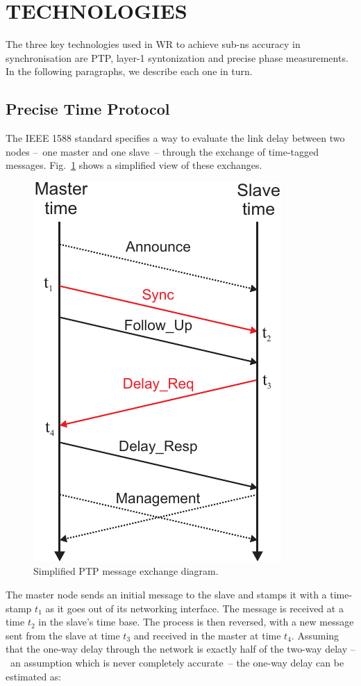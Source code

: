 \documentclass{../JAC2003}
\begin{document}
\section{TECHNOLOGIES}

The three key technologies used in WR to achieve sub-ns accuracy in
synchronisation are PTP, layer-1 syntonization and precise phase
measurements. In the following paragraphs, we describe each one in
turn.

\subsection{Precise Time Protocol}

The IEEE 1588 standard specifies a way to evaluate the link delay
between two nodes --~one master and one slave~-- through the exchange
of time-tagged messages. Fig.~\ref{ptp-fig} shows a simplified view of
these exchanges.

\begin{figure}[htb]
   \centering
   \includegraphics*[width=0.5\columnwidth]{protocol/ptpMSGs-color.pdf}
   \caption{Simplified PTP message exchange diagram.}
   \label{ptp-fig}
\end{figure}

The master node sends an initial message to the slave and stamps it with
a time-stamp $t_1$ as it goes out of its networking interface. The
message is received at a time $t_2$ in the slave's time base. The
process is then reversed, with a new message sent from the slave at
time $t_3$ and received in the master at time $t_4$. Assuming that the
one-way delay through the network is exactly half of the two-way delay
--~an assumption which is never completely accurate~-- the one-way
delay can be estimated as:
\end{document}
